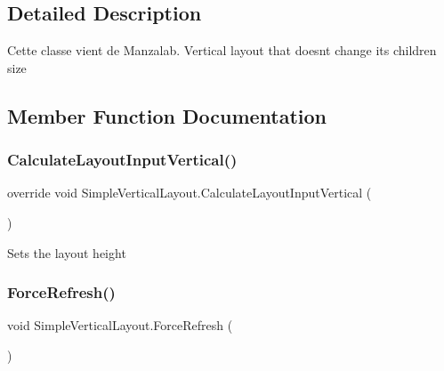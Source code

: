 \subsection{Detailed Description}
Cette classe vient de Manzalab. Vertical layout that doesn\textquotesingle{}t change its children size 



\subsection{Member Function Documentation}
\mbox{\label{class_simple_vertical_layout_ab051655845a7b1cde35991eadebeb66b}} 
\subsubsection{\texorpdfstring{Calculate\+Layout\+Input\+Vertical()}{CalculateLayoutInputVertical()}}
{\footnotesize\ttfamily override void Simple\+Vertical\+Layout.\+Calculate\+Layout\+Input\+Vertical (\begin{DoxyParamCaption}{ }\end{DoxyParamCaption})\hspace{0.3cm}{\ttfamily [inline]}}



Sets the layout height 

\mbox{\label{class_simple_vertical_layout_a7c7f78ba7afa7d7f616bd5dbad9add09}} 
\subsubsection{\texorpdfstring{Force\+Refresh()}{ForceRefresh()}}
{\footnotesize\ttfamily void Simple\+Vertical\+Layout.\+Force\+Refresh (\begin{DoxyParamCaption}{ }\end{DoxyParamCaption})\hspace{0.3cm}{\ttfamily [inline]}}



